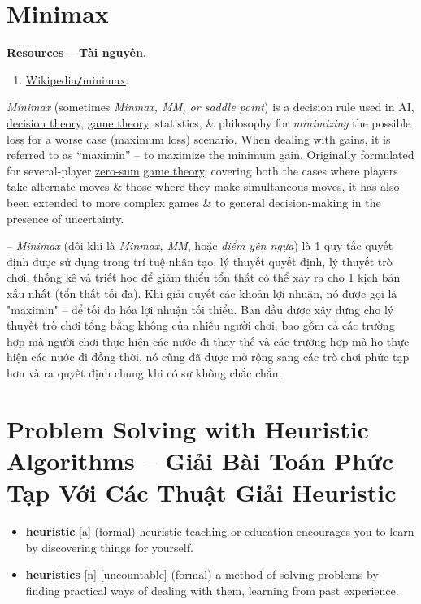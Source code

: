 \documentclass{article}
\begin{document}
\section{Minimax}
\textbf{\textsf{Resources -- Tài nguyên.}}
\begin{enumerate}
	\item \href{https://en.wikipedia.org/wiki/Minimax}{Wikipedia{\tt/}minimax}.
\end{enumerate}
{\it Minimax} (sometimes {\it Minmax, MM, or {\it saddle point}}) is a decision rule used in AI, \href{https://en.wikipedia.org/wiki/Decision_theory}{decision theory}, \href{https://en.wikipedia.org/wiki/Game_theory}{game theory}, statistics, \& philosophy for {\it minimizing} the possible \href{https://en.wikipedia.org/wiki/Loss_function}{loss} for a \href{https://en.wikipedia.org/wiki/Worst-case_scenario}{worse case (maximum loss) scenario}. When dealing with gains, it is referred to as ``maximin'' -- to maximize the minimum gain. Originally formulated for several-player \href{https://en.wikipedia.org/wiki/Zero-sum}{zero-sum} \href{https://en.wikipedia.org/wiki/Game_theory}{game theory}, covering both the cases where players take alternate moves \& those where they make simultaneous moves, it has also been extended to more complex games \& to general decision-making in the presence of uncertainty.

-- {\it Minimax} (đôi khi là {\it Minmax, MM}, hoặc {\it điểm yên ngựa}) là 1 quy tắc quyết định được sử dụng trong trí tuệ nhân tạo, lý thuyết quyết định, lý thuyết trò chơi, thống kê và triết học để giảm thiểu tổn thất có thể xảy ra cho 1 kịch bản xấu nhất (tổn thất tối đa). Khi giải quyết các khoản lợi nhuận, nó được gọi là "maximin" – để tối đa hóa lợi nhuận tối thiểu. Ban đầu được xây dựng cho lý thuyết trò chơi tổng bằng không của nhiều người chơi, bao gồm cả các trường hợp mà người chơi thực hiện các nước đi thay thế và các trường hợp mà họ thực hiện các nước đi đồng thời, nó cũng đã được mở rộng sang các trò chơi phức tạp hơn và ra quyết định chung khi có sự không chắc chắn.


\section{Problem Solving with Heuristic Algorithms -- Giải Bài Toán Phức Tạp Với Các Thuật Giải Heuristic}

\begin{itemize}\sf\small
	\item \textbf{heuristic} [a] (formal) heuristic teaching or education encourages you to learn by discovering things for yourself.
	\item \textbf{heuristics} [n] [uncountable] (formal) a method of solving problems by finding practical ways of dealing with them, learning from past experience.
\end{itemize}
\end{document}
